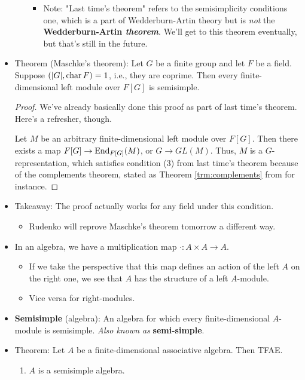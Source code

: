 \documentclass[../notes.tex]{subfiles}
\begin{document}
\begin{itemize}
\begin{itemize}
\begin{itemize}
            \item Note: "Last time's theorem" refers to the semisimplicity conditions one, which is a part of Wedderburn-Artin theory but is \emph{not} the \textbf{Wedderburn-Artin \emph{theorem}}. We'll get to this theorem eventually, but that's still in the future.
        \end{itemize}
    \end{itemize}
    \item Theorem (Maschke's theorem): Let $G$ be a finite group and let $F$ be a field. Suppose $(|G|,\operatorname{char} F)=1$, i.e., they are coprime. Then every finite-dimensional left module over $F[G]$ is semisimple.
    \begin{proof}
        We've already basically done this proof as part of last time's theorem. Here's a refresher, though.\par
        Let $M$ be an arbitrary finite-dimensional left module over $F[G]$. Then there exists a map $F[G]\to\operatorname{End}_{F[G]}(M)$, or $G\to GL(M)$. Thus, $M$ is a $G$-representation, which satisfies condition (3) from last time's theorem because of the complements theorem, stated as Theorem \ref{trm:complements} from \textcite{bib:Serre} for instance.
    \end{proof}
    \item Takeaway: The proof actually works for any field under this condition.
    \begin{itemize}
        \item Rudenko will reprove Maschke's theorem tomorrow a different way.
    \end{itemize}
    \item In an algebra, we have a multiplication map $\cdot:A\times A\to A$.
    \begin{itemize}
        \item If we take the perspective that this map defines an action of the left $A$ on the right one, we see that $A$ has the structure of a left $A$-module.
        \item Vice versa for right-modules.
    \end{itemize}
    \item \textbf{Semisimple} (algebra): An algebra for which every finite-dimensional $A$-module is semisimple. \emph{Also known as} \textbf{semi-simple}.
    \item Theorem: Let $A$ be a finite-dimensional associative algebra. Then TFAE.
    \begin{enumerate}
        \item $A$ is a semisimple algebra.

\end{enumerate}
\end{itemize}
\end{document}
